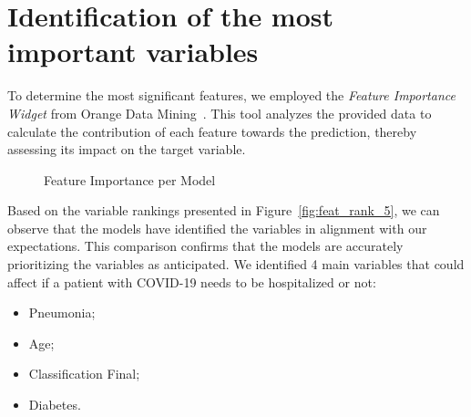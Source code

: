 \section{Identification of the most important variables}

To determine the most significant features, we employed the 
\emph{Feature Importance Widget} from Orange Data 
Mining~\parencite[]{2015:odm}. This tool analyzes the provided data
to calculate the contribution of each feature towards the 
prediction, thereby assessing its impact on the target variable.

\begin{figure}[H]%
    \caption{Feature Importance per Model}%
    \label{fig:fi_importance_per_label}%
    \centering
    \qquad
    \qquad
\end{figure}

Based on the variable rankings presented in Figure~\ref{fig:feat_rank_5}, we 
can observe that the models have identified the variables in alignment with 
our expectations. This comparison confirms that the models are accurately 
prioritizing the variables as anticipated. We identified 4 main variables 
that could affect if a patient with COVID-19 needs to be hospitalized or not:
\begin{itemize}
    \item Pneumonia;
    \item Age;
    \item Classification Final;
    \item Diabetes.
\end{itemize}

